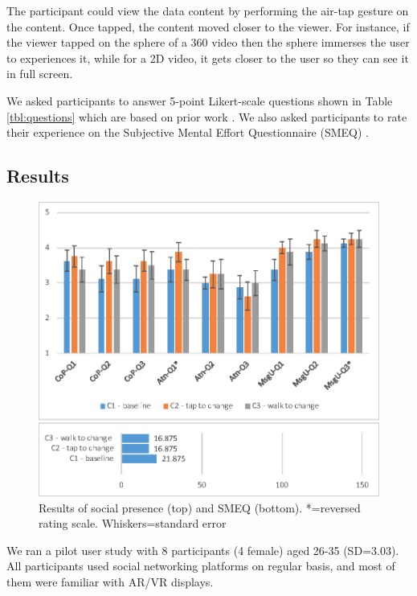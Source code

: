 The participant could view the data content by performing the air-tap gesture on the content. Once tapped, the content moved closer to the viewer. For instance, if the viewer tapped on the sphere of a 360 video then the sphere immerses the user to experiences it, while for a 2D video, it gets closer to the user so they can see it in full screen.

We asked participants to answer 5-point Likert-scale questions shown in Table \ref{tbl:questions} which are based on prior work \cite{Biocca2003}. We also asked participants to rate their experience on the Subjective Mental Effort Questionnaire (SMEQ) \cite{Sauro2009}. 

\subsection{Results}

\begin{figure}[h]
  \centering
  \includegraphics[width=\columnwidth]{images/chi/images-01.eps}
  \caption{Results of social presence (top) and SMEQ (bottom). *=reversed rating scale. Whiskers=standard error}
  \label{fig:data:results}
\end{figure}

We ran a pilot user study with 8 participants (4 female) aged 26-35 (SD=3.03). All participants used social networking platforms on regular basis, and most of them were familiar with AR/VR displays. 

